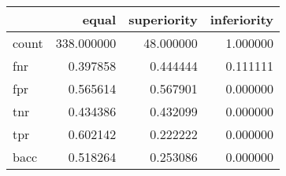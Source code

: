 \begin{tabular}{lrrr}
\toprule
{} &       equal &  superiority &  inferiority \\
\midrule
count &  338.000000 &    48.000000 &     1.000000 \\
fnr   &    0.397858 &     0.444444 &     0.111111 \\
fpr   &    0.565614 &     0.567901 &     0.000000 \\
tnr   &    0.434386 &     0.432099 &     0.000000 \\
tpr   &    0.602142 &     0.222222 &     0.000000 \\
bacc  &    0.518264 &     0.253086 &     0.000000 \\
\bottomrule
\end{tabular}
